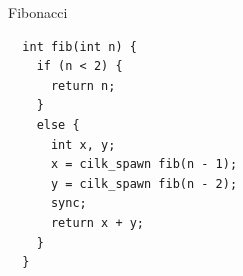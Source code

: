 \documentclass{beamer}
\begin{document}
\begin{frame}[fragile]{Fibonacci}
\begin{verbatim}
  int fib(int n) {
    if (n < 2) {
      return n;
    }
    else {
      int x, y;
      x = cilk_spawn fib(n - 1);
      y = cilk_spawn fib(n - 2);
      sync;
      return x + y;
    }
  }
\end{verbatim}
\end{frame}
\end{document}
